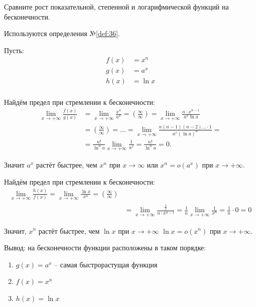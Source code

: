 \begin{question}
    Сравните рост показательной, степенной и логарифмической функций на бесконечности.
\end{question}
\begin{used}
    Используются определения №\ref{def:36}.
\end{used}
\begin{answer}
    Пусть:
    \begin{align*}
        f(x) &= x^n \\
        g(x) &= a^x \\
        h(x) &= \ln x \\
    \end{align*}

    Найдём предел при стремлении к бесконечности:
    \begin{align*}
        \lim_{x \to +\infty} \frac{f(x)}{g(x)} &= \lim_{x \to +\infty} \frac{x^n}{a^x} = \left( \frac{\infty}{\infty} \right) = \lim_{x \to +\infty} \frac{n \cdot x ^ {n-1}}{a^x \ln a} \\
            &= \left( \frac{\infty}{\infty} \right) = \ldots = \lim_{x \to +\infty} \frac{n(n-1)(n-2)\ldots \cdot 1}{a^x(\ln a)^n} = \\
            &= \frac{n!}{\ln^n a} \lim_{x \to +\infty} \frac{1}{a^x} = \frac{n!}{\ln^n a} = 0.
    \end{align*}

    Значит $a^x$ растёт быстрее, чем  $x^n$ при $x \to \infty$ или $x^n = o(a^x)$ при $x \to +\infty$.

    Найдём предел при стремлении к бесконечности:
    \begin{align*}
        \lim_{x \to +\infty} \frac{h(x)}{f(x)} = \lim_{x \to +\infty} \frac{\ln x}{x^n} = \left( \frac{\infty}{\infty} \right) \\
            &= \lim_{x \to +\infty}  \frac{\frac{1}{x}}{n \cdot x^{n-1}} = \frac{1}{n} \lim_{x \to +\infty} \frac{1}{x^n} = \frac{1}{n} \cdot 0 = 0
    \end{align*}

    Значит, $x^n$ растёт быстрее, чем  $\ln x$ при $x\to +\infty$ $\ln x = o(x^n)$ при $x \to  +\infty$.

    Вывод: на бесконечности функции расположены в таком порядке:
    \begin{enumerate}
        \item $g(x) = a^x$ -- самая быстрорастущая функция \\
        \item $f(x) = x^n$ \\
        \item $h(x) = \ln x$
    \end{enumerate}
\end{answer}
\pagebreak




